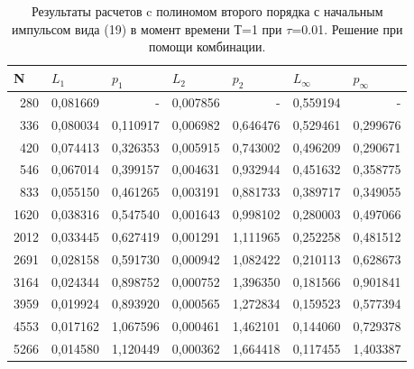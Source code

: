 \documentclass[14pt]{article}
\begin{document}
\begin{table}[]
\caption{Результаты расчетов c полиномом второго порядка с начальным импульсом вида (19) в момент времени Т=1 при $\tau$=0.01. Решение при помощи комбинации.}
\begin{tabular}{|r|l|l|l|l|l|l|}
\hline
\multicolumn{1}{|l|}{N} & \multicolumn{1}{l|}{$L_1$}        & \multicolumn{1}{l|}{$p_1$} & \multicolumn{1}{l|}{$L_2$}     & \multicolumn{1}{l|}{$p_2$} & \multicolumn{1}{l|}{$L_\infty$} & \multicolumn{1}{l|}{$p_\infty$} \\ \hline
280                         & 0,081669 & \multicolumn{1}{r|}{-} & 0,007856 & \multicolumn{1}{r|}{-}        & 0,559194 & \multicolumn{1}{r|}{-} \\ \hline
336                         & 0,080034 & 0,110917               & 0,006982 & 0,646476 & 0,529461 & 0,299676               \\ \hline
420                         & 0,074413 & 0,326353               & 0,005915 & 0,743002 & 0,496209 & 0,290671               \\ \hline
546                         & 0,067014 & 0,399157               & 0,004631 & 0,932944 & 0,451632 & 0,358775               \\ \hline
833                         & 0,055150 & 0,461265               & 0,003191 & 0,881733 & 0,389717 & 0,349055               \\ \hline
1620                        & 0,038316 & 0,547540               & 0,001643 & 0,998102 & 0,280003 & 0,497066               \\ \hline
2012                        & 0,033445 & 0,627419               & 0,001291 & 1,111965 & 0,252258 & 0,481512               \\ \hline
2691                        & 0,028158 & 0,591730               & 0,000942 & 1,082422 & 0,210113 & 0,628673               \\ \hline
3164                        & 0,024344 & 0,898752               & 0,000752 & 1,396350 & 0,181566 & 0,901841               \\ \hline
3959                        & 0,019924 & 0,893920               & 0,000565 & 1,272834 & 0,159523 & 0,577394               \\ \hline
4553                        & 0,017162 & 1,067596               & 0,000461 & 1,462101 & 0,144060 & 0,729378               \\ \hline
5266                        & 0,014580 & 1,120449               & 0,000362 & 1,664418 & 0,117455 & 1,403387               \\ \hline

\end{tabular}
\end{table}
\end{document}
